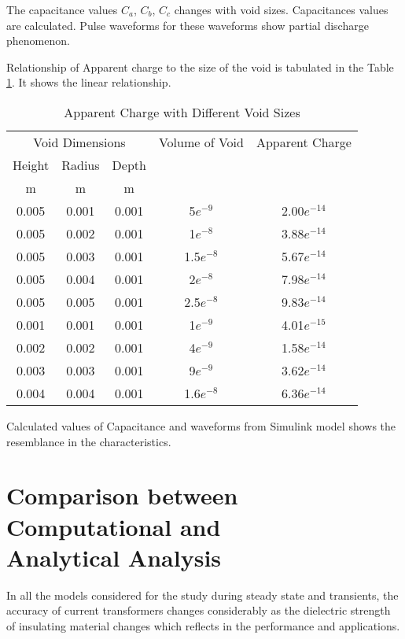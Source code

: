 The capacitance values $C_a$, $C_b$, $C_c$ changes with void sizes. Capacitances values are calculated. Pulse waveforms for these waveforms show partial discharge phenomenon.

Relationship of Apparent charge to the size of the void is tabulated in the Table \ref{table:Apparent Charge with Different Void Sizes}. It shows the linear relationship.

\begin{table}[h!]
\caption{Apparent Charge with Different Void Sizes}
\label{table:Apparent Charge with Different Void Sizes}
\centering
\begin{tabular}{|c|c|c|c|c|}
\hline 
\multicolumn{3}{|c|}{Void Dimensions} &	Volume of Void	& Apparent Charge \\ \cline{1-3}
Height & Radius & Depth &  &  \\
m	&m	&m	& 	& 	\\ \hline \hline
0.005	&0.001	&0.001	&5$e^{-9}$&	2.00$e^{-14}$\\ \hline
0.005	&0.002	&0.001	&1$e^{-8}$&	3.88$e^{-14}$\\ \hline
0.005	&0.003	&0.001	&1.5$e^{-8}$&	5.67$e^{-14}$\\ \hline
0.005	&0.004	&0.001	&2$e^{-8}$&	7.98$e^{-14}$\\ \hline
0.005	&0.005	&0.001	&2.5$e^{-8}$&	9.83$e^{-14}$\\ \hline \hline
 	 	 	 	 
0.001	&0.001	&0.001	&1$e^{-9}$&	4.01$e^{-15}$\\ \hline
0.002	&0.002	&0.001	&4$e^{-9}$&	1.58$e^{-14}$\\ \hline
0.003	&0.003	&0.001	&9$e^{-9}$&	3.62$e^{-14}$\\ \hline
0.004	&0.004	&0.001	&1.6$e^{-8}$&	6.36$e^{-14}$\\ \hline
\end{tabular} 
\end{table}

Calculated values of Capacitance and waveforms from Simulink model shows the resemblance in the characteristics. 
\clearpage

\section[Comparison between Computational and Analytical Analysis]{Comparison between Computational and\\Analytical Analysis}
In all the models considered for the study during steady state and transients, the accuracy of current transformers changes considerably as the dielectric strength of insulating material changes which reflects in the performance and applications.

